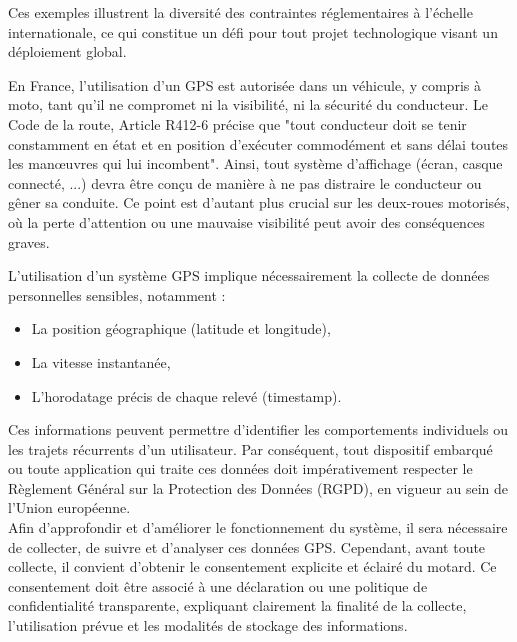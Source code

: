 Ces exemples illustrent la diversité des contraintes réglementaires à l’échelle internationale, ce qui constitue un défi pour tout projet technologique visant un déploiement global.
\vspace{0.5cm}

En France, l'utilisation d’un GPS est autorisée dans un véhicule, y compris à moto, tant qu’il ne compromet ni la visibilité, ni la sécurité du conducteur. Le Code de la route, Article R412-6\cite{loi_code_de_la_route} précise que "tout conducteur doit se tenir constamment en état et en position d'exécuter commodément et sans délai toutes les manœuvres qui lui incombent".
Ainsi, tout système d’affichage (écran, casque connecté, ...) devra être conçu de manière à ne pas distraire le conducteur ou gêner sa conduite. Ce point est d’autant plus crucial sur les deux-roues motorisés, où la perte d’attention ou une mauvaise visibilité peut avoir des conséquences graves.
\vspace{0.5cm}

L'utilisation d'un système GPS implique nécessairement la collecte de données personnelles sensibles, notamment :
\begin{itemize}
\item La position géographique (latitude et longitude),
\item La vitesse instantanée,
\item L'horodatage précis de chaque relevé (timestamp).
\end{itemize}
Ces informations peuvent permettre d'identifier les comportements individuels ou les trajets récurrents d'un utilisateur. Par conséquent, tout dispositif embarqué ou toute application qui traite ces données doit impérativement respecter le Règlement Général sur la Protection des Données (RGPD), en vigueur au sein de l'Union européenne.\\
Afin d'approfondir et d'améliorer le fonctionnement du système, il sera nécessaire de collecter, de suivre et d'analyser ces données GPS. Cependant, avant toute collecte, il convient d'obtenir le consentement explicite et éclairé du motard. Ce consentement doit être associé à une déclaration ou une politique de confidentialité transparente, expliquant clairement la finalité de la collecte, l'utilisation prévue et les modalités de stockage des informations.

